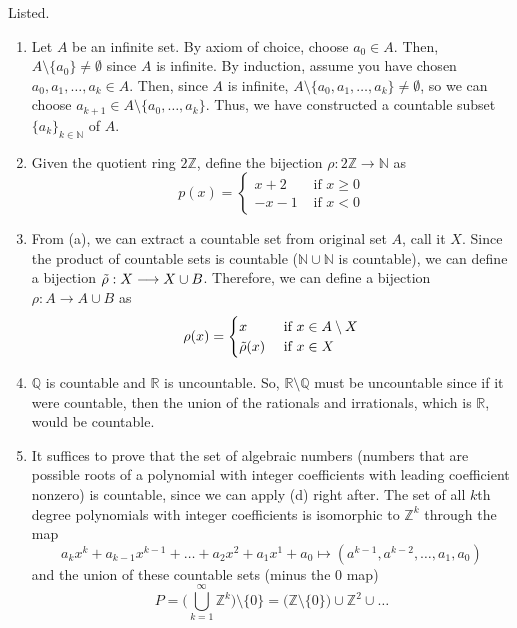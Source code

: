 \documentclass{article}
\begin{document}
    \begin{solution}
    Listed. 
    \begin{enumerate}
        \item Let $A$ be an infinite set. By axiom of choice, choose $a_0 \in A$. Then, $A \setminus \{a_0\} \neq \emptyset$ since $A$ is infinite. By induction, assume you have chosen $a_0, a_1, \ldots, a_k \in A$. Then, since $A$ is infinite, $A \setminus \{a_0, a_1, \ldots, a_k\} \neq \emptyset$, so we can choose $a_{k+1} \in A \setminus \{a_0, \ldots, a_k\}$. Thus, we have constructed a countable subset $\{a_k\}_{k \in \mathbb{N}}$ of $A$. 
        \item Given the quotient ring $2\mathbb{Z}$, define the bijection $\rho: 2\mathbb{Z} \longrightarrow \mathbb{N}$ as 
        \[p(x) = \begin{cases} 
        x + 2 & \text{ if } x \geq 0 \\
        -x - 1 & \text{ if } x < 0 
        \end{cases}\]
        \item From (a), we can extract a countable set from original set $A$, call it $X$. Since the product of countable sets is countable ($\mathbb{N} \cup \mathbb{N}$ is countable), we can define a bijection $\Tilde{\rho}: X \longrightarrow X \cup B$. Therefore, we can define a bijection $\rho: A \longrightarrow A \cup B$ as 
        \[\rho(x) = \begin{cases} 
        x & \text{ if } x \in A \setminus X \\
        \Tilde{\rho}(x) & \text{ if } x \in X
        \end{cases}\]
        \item $\mathbb{Q}$ is countable and $\mathbb{R}$ is uncountable. So, $\mathbb{R} \setminus \mathbb{Q}$ must be uncountable since if it were countable, then the union of the rationals and irrationals, which is $\mathbb{R}$, would be countable. 
        \item It suffices to prove that the set of algebraic numbers (numbers that are possible roots of a polynomial with integer coefficients with leading coefficient nonzero) is countable, since we can apply (d) right after. The set of all $k$th degree polynomials with integer coefficients is isomorphic to $\mathbb{Z}^k$ through the map 
        \[a_k x^k + a_{k-1} x^{k-1} + \ldots + a_2 x^2 + a_1 x^1 + a_0 \mapsto (a^{k-1}, a^{k-2}, \ldots, a_1, a_0)\]
        and the union of these countable sets (minus the $0$ map) 
        \[P = \bigg(\bigcup_{k = 1}^\infty \mathbb{Z}^k\bigg) \setminus \{0\} = \big(\mathbb{Z} \setminus \{0\}\big) \cup \mathbb{Z}^2 \cup \ldots \]

\end{enumerate}
\end{solution}
\end{document}
